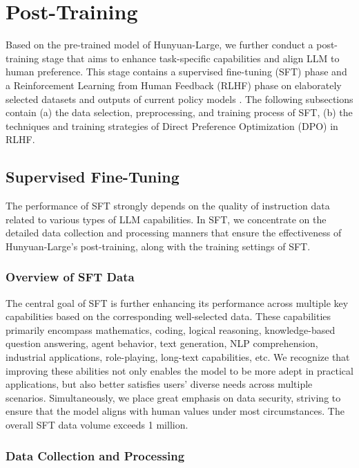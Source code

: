 \documentclass{article}
\begin{document}
\section{Post-Training}
\label{sec:post-training}
Based on the pre-trained model of Hunyuan-Large, we further conduct a post-training stage that aims to enhance task-specific capabilities and align LLM to human preference. This stage contains a supervised fine-tuning (SFT) phase and a Reinforcement Learning from Human Feedback (RLHF) phase on elaborately selected datasets and outputs of current policy models \citep{bai2022training}. The following subsections contain (a) the data selection, preprocessing, and training process of SFT, (b) the techniques and training strategies of Direct Preference Optimization (DPO) in RLHF.

\subsection{Supervised Fine-Tuning}
The performance of SFT strongly depends on the quality of instruction data related to various types of LLM capabilities. In SFT, we concentrate on the detailed data collection and processing manners that ensure the effectiveness of Hunyuan-Large's post-training, along with the training settings of SFT.

\subsubsection{Overview of SFT Data}

The central goal of SFT is further enhancing its performance across multiple key capabilities based on the corresponding well-selected data. These capabilities primarily encompass mathematics, coding, logical reasoning, knowledge-based question answering, agent behavior, text generation, NLP comprehension, industrial applications, role-playing, long-text capabilities, etc. We recognize that improving these abilities not only enables the model to be more adept in practical applications, but also better satisfies users' diverse needs across multiple scenarios. Simultaneously, we place great emphasis on data security, striving to ensure that the model aligns with human values under most circumstances. The overall SFT data volume exceeds 1 million.

\subsubsection{Data Collection and Processing}
\end{document}
